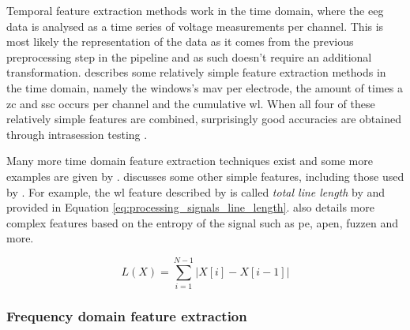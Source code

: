 Temporal feature extraction methods work in the time domain, where the \gls{eeg} data is analysed as a time series of voltage measurements per channel.
This is most likely the representation of the data as it comes from the previous preprocessing step in the pipeline and as such doesn't require an additional transformation.
 describes some relatively simple feature extraction methods in the time domain, namely the windows's \gls{mav} per electrode, the amount of times a \gls{zc} and \gls{ssc} occurs per channel and the cumulative \gls{wl}.
When all four of these relatively simple features are combined, surprisingly good accuracies are obtained through intrasession testing \citep{time_domain_eeg_features}.

Many more time domain feature extraction techniques exist and some more examples are given by \citet{eeg_features}.
\citet{eeg_features} discusses some other simple features, including those used by \citet{time_domain_eeg_features}.
For example, the \gls{wl} feature described by \citet{time_domain_eeg_features} is called \textit{total line length} by \citet{eeg_features} and provided in Equation \ref{eq:processing_signals_line_length}.
 also details more complex features based on the entropy of the signal such as \gls{pe}, \gls{apen}, \gls{fuzzen} and more.

\begin{equation}
    \label{eq:processing_signals_line_length}
    L(X) = \sum_{i=1}^{N-1} |X[i] - X[i - 1]|
\end{equation}



\subsubsection{Frequency domain feature extraction}
\label{subsubsec:processing_signals_general_pipeline_features_freqdomain}

